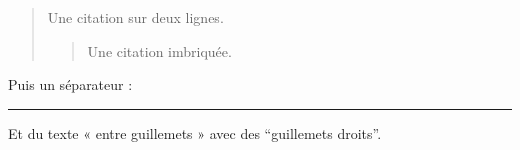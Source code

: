 \begin{quote}
Une citation sur
deux lignes.

\begin{quote}
Une citation imbriquée.
\end{quote}
\end{quote}

Puis un séparateur :

\begin{center}\rule{0.5\linewidth}{0.5pt}\end{center}

Et du texte « entre guillemets » avec des ``guillemets droits''.
